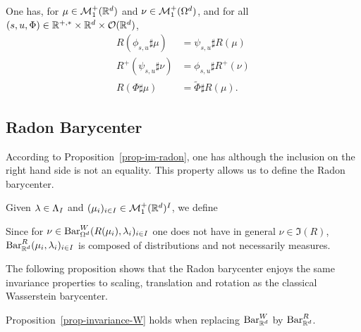 \begin{lem}\label{lem-invariances}
		One has, for $\mu \in \mathcal{M}_1^+(\mathbb{R}^d)$ and $\nu \in \mathcal{M}_1^+(\Omega^d)$, and for all 
		$(s,u,\Phi) \in \mathbb{R}^{+,*} \times \mathbb{R}^d \times \mathcal{O}(\mathbb{R}^d)$, 
		\begin{align}
		  	\label{propR} R(\phi_{s,u}\sharp\mu) &= \psi_{s,u}\sharp R(\mu)  \\ 
		  	\label{propRp} R^+(\psi_{s,u}\sharp\nu) &=  \phi_{s,u}\sharp R^+(\nu) \\
			\label{PropRot} R( \Phi \sharp \mu ) &= \tilde\Phi \sharp R(\mu).
		\end{align}			
\end{lem}

\subsection{Radon Barycenter}

According to Proposition~\ref{prop-im-radon}, one has 
although the inclusion on the right hand side is not an equality. This property allows us to define the Radon barycenter.

\begin{defn}\label{defn-radon-baryc} Given $\lambda \in \Lambda_I$ and $(\mu_i)_{i \in I} \in \mathcal{M}_1^+(\mathbb{R}^d)^I$, we define
\end{defn}

Since for $\nu \in \text{\upshape Bar}_{\Omega^d}^W(R(\mu_i),\lambda_i)_{i \in I}$ one does not have in general $\nu \in \Im(R)$, $\text{\upshape Bar}_{\mathbb{R}^d}^R(\mu_i,\lambda_i)_{i \in I}$ is composed of distributions and not necessarily measures.


The following proposition shows that the Radon barycenter enjoys the same invariance properties to scaling, translation and rotation as the classical Wasserstein barycenter. 


\begin{prop}
\label{prop:InvarianceHolds}
	Proposition~\ref{prop-invariance-W} holds when replacing $\text{\upshape Bar}_{\mathbb{R}^d}^W$ by $\text{\upshape Bar}_{\mathbb{R}^d}^R$.
\end{prop}



